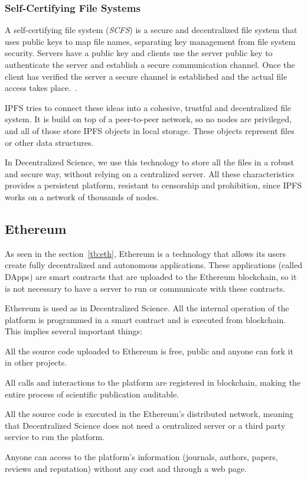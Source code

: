 \subsubsection*{Self-Certifying File Systems}
\label{tech:sec:ipfs:scfs}

 A self-certifying file system (\emph{SCFS}) is a secure and
decentralized file system that uses public keys to map file names, separating
key management from file system security. Servers have a public key and clients
use the server public key to authenticate the server and establish a secure
communication channel. Once the client has verified the server a secure channel
is established and the actual file access takes place.~\cite{mazieres2000self}.

IPFS tries to connect these ideas into a cohesive, trustful and decentralized
file system. It is build on top of a peer-to-peer network, so no nodes are
privileged, and all of those store IPFS objects in local storage. These objects
represent files or other data structures.

In Decentralized Science, we use this technology to store all the files in a
robust and secure way, without relying on a centralized server. All these
characteristics provides a persistent platform, resistant to censorship and
prohibition, since IPFS works on a network of thousands of nodes.

\subsection{Ethereum}
\label{tech:sec:ethereum}

As seen in the section~\ref{tb:eth}, Ethereum is a technology that allows its
users create fully decentralized and autonomous applications. These applications
(called DApps) are smart contracts that are uploaded to the Ethereum blockchain,
so it is not necessary to have a server to run or communicate with these
contracts.

Ethereum is used as  in Decentralized Science. All the internal
operation of the platform is programmed in a smart contract and is executed from
blockchain. This implies several important things:

\begin{itemize}
   All the source code uploaded to Ethereum is free, public
  and anyone can fork it in other projects.

   All calls and interactions to the platform are
  registered in blockchain, making the entire process of scientific publication
  auditable.

   All the source code is executed in the Ethereum's
  distributed network, meaning that Decentralized Science does not need a
  centralized server or a third party service to run the platform.

   Anyone can access to the platform's
  information (journals, authors, papers, reviews and reputation) without any
  cost and through a web page.
\end{itemize}


